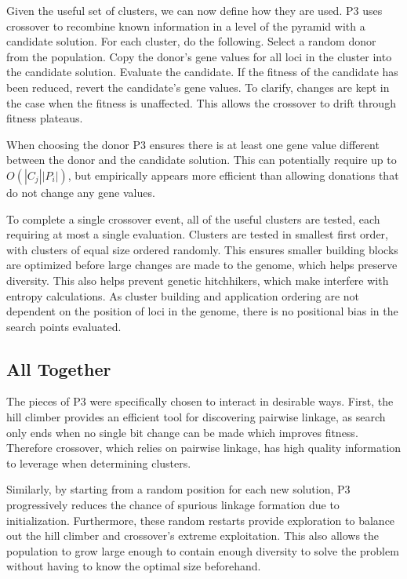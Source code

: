 \documentclass{sig-alternate}
\begin{document}
Given the useful set of clusters, we can now define how they are used.  P3 uses
crossover to recombine known information in a level of the pyramid with a candidate
solution.  For each cluster, do the following.  Select a random donor from the population.
Copy the donor's gene values for all loci in the cluster into the candidate solution.
Evaluate the candidate.  If the fitness of the candidate has been reduced, revert the candidate's
gene values.  To clarify, changes are kept in the case when the fitness is unaffected.
This allows the crossover to drift through fitness plateaus.

When choosing the donor P3 ensures there is at least one gene value
different between the donor and the candidate solution.  This can potentially require
up to $O(|C_j||P_i|)$, but empirically appears more efficient than allowing donations that
do not change any gene values.

To complete a single crossover event, all of the useful clusters are tested, each
requiring at most a single evaluation.  Clusters are tested in smallest first order,
with clusters of equal size ordered randomly.  This ensures smaller building blocks
are optimized before large changes are made to the genome, which helps preserve
diversity.  This also helps prevent genetic hitchhikers, which make interfere with
entropy calculations.  As cluster building and application ordering are not dependent on
the position of loci in the genome, there is no positional bias in the search points
evaluated.

\subsection{All Together}
\label{sec-alltogether}
The pieces of P3 were specifically chosen to interact in desirable ways.  First,
the hill climber provides an efficient tool for discovering pairwise linkage, as
search only ends when no single bit change can be made which improves fitness.
Therefore crossover, which relies on pairwise linkage, has high quality information
to leverage when determining clusters.

Similarly, by starting from a random position for each new solution, P3 progressively reduces
the chance of spurious linkage formation due to initialization.  Furthermore, these random
restarts provide exploration to balance out the hill climber and crossover's extreme
exploitation.  This also allows the population to grow large enough to contain enough
diversity to solve the problem without having to know the optimal size beforehand.
\end{document}
